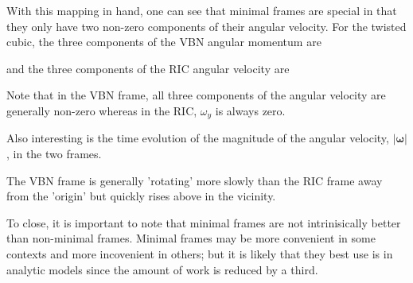 \documentclass[10pt]{article}
\begin{document}
With this mapping in hand, one can see that minimal frames are special in that they only have two non-zero components of their angular velocity.  For the twisted cubic, the three components of the VBN angular momentum are

and the three components of the RIC angular velocity are


Note that in the VBN frame, all three components of the angular velocity are generally non-zero whereas in the RIC, $\omega_y$ is always zero.

Also interesting is the time evolution of the magnitude of the angular velocity, $|\mathbf{\omega}|$, in the two frames.


The VBN frame is generally 'rotating' more slowly than the RIC frame away from the 'origin' but quickly rises above in the vicinity.  

To close, it is important to note that minimal frames are not intrinisically better than non-minimal frames.  Minimal frames may be more convenient in some contexts and more incovenient in others; but it is likely that they best use is in analytic models since the amount of work is reduced by a third. 
\end{document}
